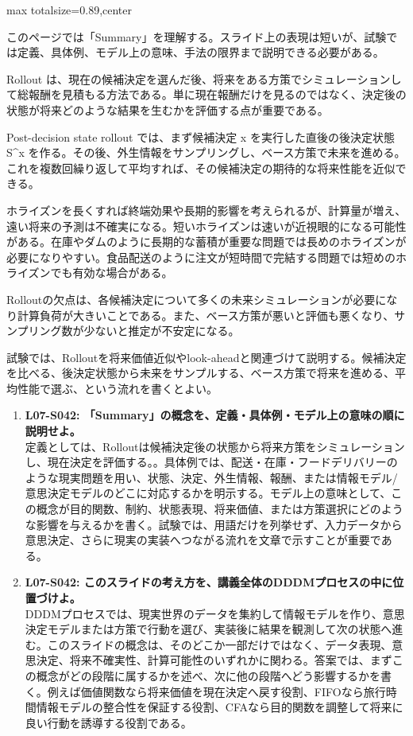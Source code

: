 \begin{minipage}[t]{0.58\textwidth}
\begin{adjustbox}{max totalsize={\textwidth}{0.89\textheight},center}
\begin{minipage}{\textwidth}\scriptsize
{}このページでは「Summary」を理解する。スライド上の表現は短いが、試験では定義、具体例、モデル上の意味、手法の限界まで説明できる必要がある。\par
Rollout は、現在の候補決定を選んだ後、将来をある方策でシミュレーションして総報酬を見積もる方法である。単に現在報酬だけを見るのではなく、決定後の状態が将来どのような結果を生むかを評価する点が重要である。\par
Post-decision state rollout では、まず候補決定 x を実行した直後の後決定状態 S\textasciicircum{}x を作る。その後、外生情報をサンプリングし、ベース方策で未来を進める。これを複数回繰り返して平均すれば、その候補決定の期待的な将来性能を近似できる。\par
ホライズンを長くすれば終端効果や長期的影響を考えられるが、計算量が増え、遠い将来の予測は不確実になる。短いホライズンは速いが近視眼的になる可能性がある。在庫やダムのように長期的な蓄積が重要な問題では長めのホライズンが必要になりやすい。食品配送のように注文が短時間で完結する問題では短めのホライズンでも有効な場合がある。\par
Rolloutの欠点は、各候補決定について多くの未来シミュレーションが必要になり計算負荷が大きいことである。また、ベース方策が悪いと評価も悪くなり、サンプリング数が少ないと推定が不安定になる。\par
試験では、Rolloutを将来価値近似やlook-aheadと関連づけて説明する。候補決定を比べる、後決定状態から未来をサンプルする、ベース方策で将来を進める、平均性能で選ぶ、という流れを書くとよい。\par{}\begin{enumerate}\item \textbf{L07-S042: 「Summary」の概念を、定義・具体例・モデル上の意味の順に説明せよ。}\\定義としては、Rolloutは候補決定後の状態から将来方策をシミュレーションし、現在決定を評価する。。具体例では、配送・在庫・フードデリバリーのような現実問題を用い、状態、決定、外生情報、報酬、または情報モデル/意思決定モデルのどこに対応するかを明示する。モデル上の意味として、この概念が目的関数、制約、状態表現、将来価値、または方策選択にどのような影響を与えるかを書く。試験では、用語だけを列挙せず、入力データから意思決定、さらに現実の実装へつながる流れを文章で示すことが重要である。\item \textbf{L07-S042: このスライドの考え方を、講義全体のDDDMプロセスの中に位置づけよ。}\\DDDMプロセスでは、現実世界のデータを集約して情報モデルを作り、意思決定モデルまたは方策で行動を選び、実装後に結果を観測して次の状態へ進む。このスライドの概念は、そのどこか一部だけではなく、データ表現、意思決定、将来不確実性、計算可能性のいずれかに関わる。答案では、まずこの概念がどの段階に属するかを述べ、次に他の段階へどう影響するかを書く。例えば価値関数なら将来価値を現在決定へ戻す役割、FIFOなら旅行時間情報モデルの整合性を保証する役割、CFAなら目的関数を調整して将来に良い行動を誘導する役割である。\end{enumerate}

\end{minipage}
\end{adjustbox}
\end{minipage}
